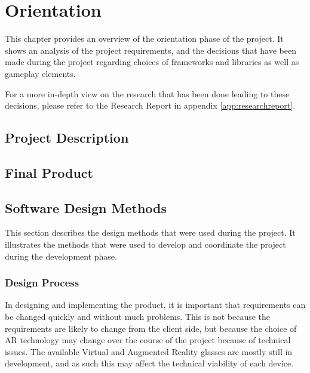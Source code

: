 \chapter{Orientation} \label{cha:orientation}

  This chapter provides an overview of the orientation phase of the project.
  It shows an analysis of the project requirements, and the decisions that
  have been made during the project regarding choices of frameworks and
  libraries as well as gameplay elements.

  For a more in-depth view on the research that has been done leading to
  these decisions, please refer to the Research Report in appendix
  \ref{app:researchreport}.

  \section{Project Description} \label{sec:projectdescription}

  \section{Final Product} \label{sec:finalproduct}

  \section{Software Design Methods} \label{sec:designmethods}
    This section describes the design methods that were used during the
    project. It illustrates the methods that were used to develop and
    coordinate the project during the development phase.

    \subsection{Design Process} \label{ssec:designprocess}
      In designing and implementing the product, it is important that
      requirements can be changed quickly and without much problems. This is
      not because the requirements are likely to change from the client
      side, but because the choice of AR technology may change over the
      course of the project because of technical issues. The available Virtual
      and Augmented Reality glasses are mostly still in development, and as
      such this may affect the technical viability of each device.

